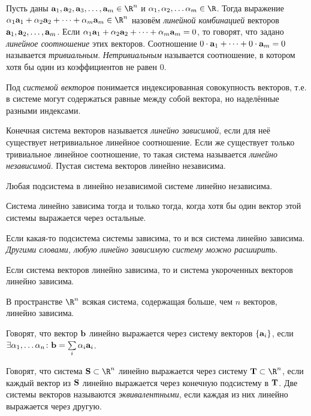 \begin{df}
  Пусть даны $\ab_1, \ab_2,\ab_3,\dots, \ab_m\in\R^n$ и $\al_1,\al_2,\dots\al_m\in\R$. Тогда выражение $\al_1\ab_1+\al_2\ab_2+\dots+\al_m\ab_m\in\R^n$ назовём \emph{линейной комбинацией} векторов ${\bf a}_1, {\bf a}_2,\dots, {\bf a}_m$. Если $\alpha_1{\bf a}_1+\alpha_2{\bf a}_2+\dots+\alpha_m{\bf a}_m=0$, то говорят, что задано \emph{линейное соотношение} этих векторов. Соотношение $0\cdot{\bf a}_1+\dots+0\cdot{\bf a}_m=0$ называется \emph{тривиальным}. \emph{Нетривиальным} называется соотношение, в котором хотя бы один из коэффициентов не равен 0.
\end{df}
\begin{df}
  Под \emph{системой векторов} понимается индексированная совокупность векторов, т.е. в системе могут содержаться равные между собой вектора, но наделённые разными индексами.
\end{df}
\begin{df}
  Конечная система векторов называется \emph{линейно зависимой}, если для неё существует нетривиальное линейное соотношение. Если же существует только тривиальное линейное соотношение, то такая система называется \emph{линейно независимой}. Пустая система векторов линейно независима.
\end{df}
\begin{stm}
  Любая подсистема в линейно независимой системе линейно независима.
\end{stm}
\begin{stm}
  Система линейно зависима тогда и только тогда, когда хотя бы один вектор этой системы выражается через остальные.
\end{stm}
\begin{stm}
  Если какая-то подсистема системы зависима, то и вся система линейно зависима. \emph{Другими словами, любую линейно зависимую систему можно расширить}.
\end{stm}
\begin{stm}
  Если система векторов линейно зависима, то и система укороченных
  векторов линейно зависима.
\end{stm}
\begin{stm}
  В пространстве $\R^n$ всякая система, содержащая больше, чем $n$ векторов, линейно зависима.
\end{stm}
\begin{df}
  Говорят, что вектор ${\bf b}$ линейно выражается через систему векторов $\{{\bf a}_i\}$, если $\exists\alpha_1,\dots\alpha_n\colon {\bf b}=\sum\limits_i \alpha_i{\bf a}_i$.

  Говорят, что система $\Sb\subset\R^n$ линейно выражается через систему $\Tb\subset\R^n$, если каждый вектор из $\mathbf{S}$ линейно выражается через конечную подсистему в $\mathbf{T}$. Две системы векторов называются 
\emph{эквивалентными}, если каждая из них линейно выражается через другую.
\end{df}

